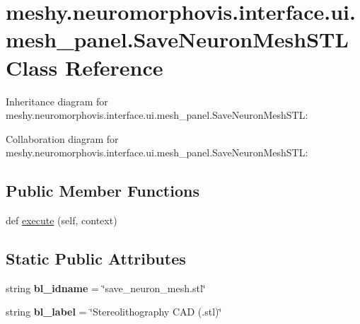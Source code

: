 \hypertarget{classmeshy_1_1neuromorphovis_1_1interface_1_1ui_1_1mesh__panel_1_1SaveNeuronMeshSTL}{}\section{meshy.\+neuromorphovis.\+interface.\+ui.\+mesh\+\_\+panel.\+Save\+Neuron\+Mesh\+S\+TL Class Reference}
\label{classmeshy_1_1neuromorphovis_1_1interface_1_1ui_1_1mesh__panel_1_1SaveNeuronMeshSTL}


Inheritance diagram for meshy.\+neuromorphovis.\+interface.\+ui.\+mesh\+\_\+panel.\+Save\+Neuron\+Mesh\+S\+TL\+:


Collaboration diagram for meshy.\+neuromorphovis.\+interface.\+ui.\+mesh\+\_\+panel.\+Save\+Neuron\+Mesh\+S\+TL\+:
\subsection*{Public Member Functions}
\begin{DoxyCompactItemize}
\item 
def \hyperlink{classmeshy_1_1neuromorphovis_1_1interface_1_1ui_1_1mesh__panel_1_1SaveNeuronMeshSTL_a3d79e0ecc6fcd38ce59bfd5689f2559a}{execute} (self, context)
\end{DoxyCompactItemize}
\subsection*{Static Public Attributes}
\begin{DoxyCompactItemize}
\item 
string {\bfseries bl\+\_\+idname} = \char`\"{}save\+\_\+neuron\+\_\+mesh.\+stl\char`\"{}\hypertarget{classmeshy_1_1neuromorphovis_1_1interface_1_1ui_1_1mesh__panel_1_1SaveNeuronMeshSTL_ab262a845b3b452715106397e85118492}{}\label{classmeshy_1_1neuromorphovis_1_1interface_1_1ui_1_1mesh__panel_1_1SaveNeuronMeshSTL_ab262a845b3b452715106397e85118492}

\item 
string {\bfseries bl\+\_\+label} = \char`\"{}Stereolithography C\+AD (.stl)\char`\"{}\hypertarget{classmeshy_1_1neuromorphovis_1_1interface_1_1ui_1_1mesh__panel_1_1SaveNeuronMeshSTL_ad9b098b51c5b627c98d53cac9d333ab2}{}\label{classmeshy_1_1neuromorphovis_1_1interface_1_1ui_1_1mesh__panel_1_1SaveNeuronMeshSTL_ad9b098b51c5b627c98d53cac9d333ab2}

\end{DoxyCompactItemize}


